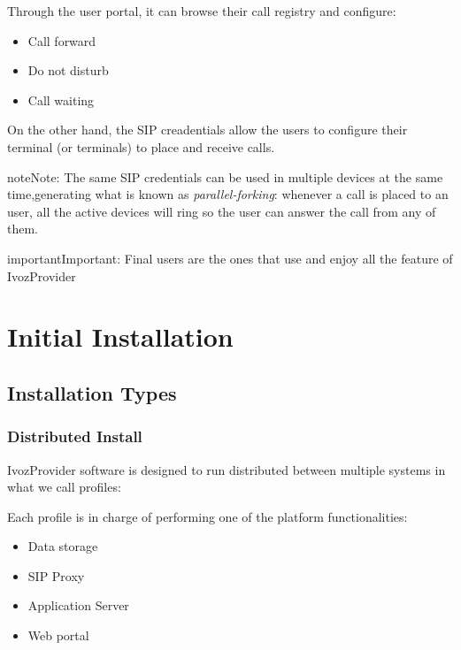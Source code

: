 \documentclass[letterpaper,10pt,english]{sphinxmanual}
\begin{document}
Through the user portal, it can browse their call registry and configure:
\begin{itemize}
\item {} 
Call forward

\item {} 
Do not disturb

\item {} 
Call waiting

\end{itemize}

On the other hand, the SIP creadentials allow the users to configure
their terminal (or terminals) to place and receive calls.

\begin{notice}{note}{Note:}
The same SIP credentials can be used in multiple devices at the same
time,generating what is known as \emph{parallel-forking}: whenever a call is
placed to an user, all the active devices will ring so the user can
answer the call from any of them.
\end{notice}

\begin{notice}{important}{Important:}
Final users are the ones that use and enjoy all the feature of
IvozProvider
\end{notice}


\chapter{Initial Installation}
\label{installation/index::doc}\label{installation/index:initial-installation}

\section{Installation Types}
\label{installation/install_types::doc}\label{installation/install_types:installation-types}

\subsection{Distributed Install}
\label{installation/install_types:distributed-install}
IvozProvider software is designed to run distributed between multiple systems
in what we call profiles:

Each profile is in charge of performing one of the platform functionalities:
\begin{itemize}
\item {} 
Data storage

\item {} 
SIP Proxy

\item {} 
Application Server

\item {} 
Web portal

\end{itemize}
\end{document}
